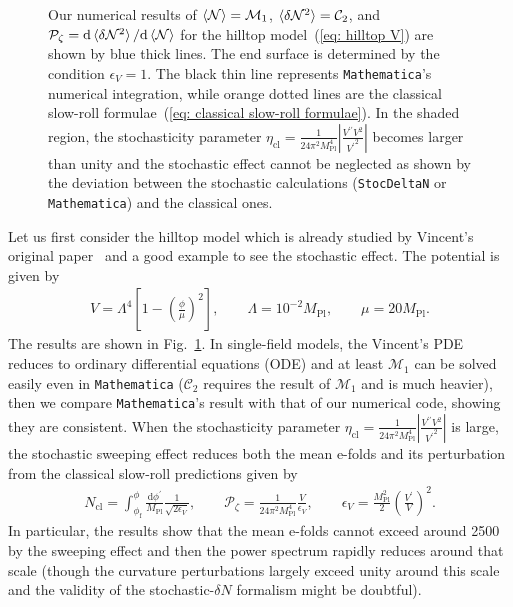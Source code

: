 \documentclass[aps, prd
, preprint
, nofootinbib 
, longbibliography
]{revtex4-1}
\newcommand{\dd}{\mathrm{d}}
\newcommand{\Mpl}{M_\text{Pl}}
\newcommand{\cl}{\text{cl}}
\newcommand{\calC}{\mathcal{C}}
\newcommand{\uf}{\text{f}}
\newcommand{\calM}{\mathcal{M}}
\newcommand{\calN}{\mathcal{N}}
\newcommand{\calP}{\mathcal{P}}
\newcommand{\bae}[1]{\begin{align} #1 \end{align}}
\begin{document}
\begin{figure}
	\caption{Our numerical results of $\braket{\calN}=\calM_1$, $\braket{\delta\calN^2}=\calC_2$, and $\calP_\zeta=\dd\braket{\delta\calN^2}/\dd\braket{\calN}$ 
	for the hilltop model~(\ref{eq: hilltop V}) are shown by blue thick lines. The end surface is determined by the condition $\epsilon_V=1$. 
	The black thin line represents \texttt{Mathematica}'s numerical integration, while orange dotted lines
	are the classical slow-roll formulae~(\ref{eq: classical slow-roll formulae}). In the shaded region, the stochasticity parameter 
	$\eta_\cl=\frac{1}{24\pi^2\Mpl^4}\left|\frac{V^{\prime\prime}V^2}{{V^\prime}^2}\right|$ becomes larger than unity and the stochastic effect cannot be neglected
	as shown by the deviation between the stochastic calculations (\texttt{StocDeltaN} or \texttt{Mathematica}) and the classical ones.}
	\label{figs: hilltop_conf}
\end{figure}

Let us first consider the hilltop model which is already studied by Vincent's original paper~\cite{Vennin:2015hra} and a good example to see the stochastic effect.
The potential is given by
\bae{\label{eq: hilltop V}
	V=\Lambda^4\left[1-\left(\frac{\phi}{\mu}\right)^2\right], \qquad \Lambda=10^{-2}\Mpl, \qquad \mu=20\Mpl.
}
The results are shown in Fig.~\ref{figs: hilltop_conf}. In single-field models, the Vincent's PDE reduces to ordinary differential equations (ODE) and at least $\calM_1$ can be solved 
easily even in \texttt{Mathematica} ($\calC_2$ requires the result of $\calM_1$ and is much heavier), then we compare \texttt{Mathematica}'s result with that of our numerical code,
showing they are consistent. 
When the stochasticity parameter $\eta_\cl=\frac{1}{24\pi^2\Mpl^4}\left|\frac{V^{\prime\prime}V^2}{{V^\prime}^2}\right|$ is large, 
the stochastic sweeping effect reduces both the mean e-folds and its perturbation from the classical slow-roll predictions given by
\bae{\label{eq: classical slow-roll formulae}
	N_\cl=\int^\phi_{\phi_\uf}\frac{\dd\phi^\prime}{\Mpl}\frac{1}{\sqrt{2\epsilon_V}}, \qquad \calP_\zeta=\frac{1}{24\pi^2\Mpl^4}\frac{V}{\epsilon_V}, 
	\qquad \epsilon_V=\frac{\Mpl^2}{2}\left(\frac{V^\prime}{V}\right)^2.
}
In particular, the results show that the mean e-folds cannot exceed around 2500 by the sweeping effect and then the power spectrum rapidly reduces around that scale 
(though the curvature perturbations largely exceed unity around this scale and the validity of the stochastic-$\delta N$ formalism might be doubtful).
\end{document}

